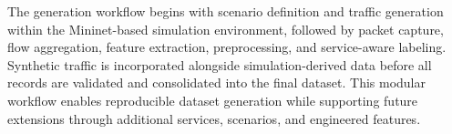 \documentclass[12pt,a4paper]{report}
\begin{document}
	The generation workflow begins with scenario definition and traffic generation within the Mininet-based simulation environment, followed by packet capture, flow aggregation, feature extraction, preprocessing, and service-aware labeling. Synthetic traffic is incorporated alongside simulation-derived data before all records are validated and consolidated into the final dataset. This modular workflow enables reproducible dataset generation while supporting future extensions through additional services, scenarios, and engineered features.
	

\end{document}
